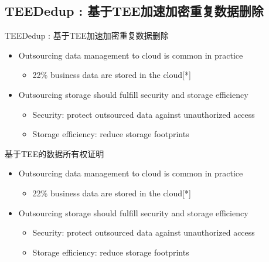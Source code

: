 \documentclass{beamer}
\newcommand{\sysnameS}{TEEDedup }
\begin{document}
\subsection{\sysnameS: 基于TEE加速加密重复数据删除}

\begin{frame}{\sysnameS: 基于TEE加速加密重复数据删除}
    \begin{itemize}
        \item Outsourcing data management to cloud is common in practice
              \begin{itemize}
                  \item 22\% business data are stored in the cloud[*]
              \end{itemize}
        \item  Outsourcing storage should fulfill security and storage efficiency
              \begin{itemize}
                  \item  Security: protect outsourced data against unauthorized access
                  \item  Storage efficiency: reduce storage footprints
              \end{itemize}
    \end{itemize}
\end{frame}

\begin{frame}{基于TEE的数据所有权证明}
    \begin{itemize}
        \item Outsourcing data management to cloud is common in practice
              \begin{itemize}
                  \item 22\% business data are stored in the cloud[*]
              \end{itemize}
        \item  Outsourcing storage should fulfill security and storage efficiency
              \begin{itemize}
                  \item  Security: protect outsourced data against unauthorized access
                  \item  Storage efficiency: reduce storage footprints
              \end{itemize}
    \end{itemize}
\end{frame}
\end{document}
